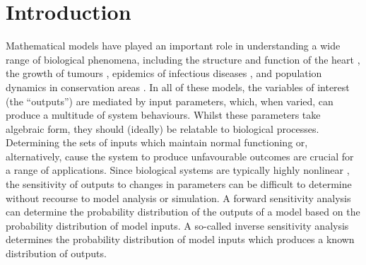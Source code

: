 \documentclass[10pt,letterpaper]{article}
\begin{document}

\section{Introduction}
\label{sec:inverse_sensitivity}

Mathematical models have played an important role in understanding a wide range of biological phenomena, including the structure and function of the heart \cite{nielsen1991mathematical,noble2004modeling}, the growth of tumours \cite{byrne2006modelling,byrne2010dissecting}, epidemics of infectious diseases \cite{anderson1992infectious}, and population dynamics in conservation areas \cite{morris2002quantitative,hanski2001spatially}. In all of these models, the variables of interest (the ``outputs'') are mediated by input parameters, which, when varied, can produce a multitude of system behaviours. Whilst these parameters take algebraic  form, they should (ideally) be relatable to biological processes. Determining the sets of inputs which maintain normal functioning or, alternatively, cause the system to produce unfavourable outcomes are crucial for a range of applications. Since biological systems are typically highly nonlinear \cite{murray2007mathematical}, the sensitivity of outputs to changes in parameters can be difficult to determine without recourse to model analysis or simulation. A forward sensitivity analysis can determine the probability distribution of the outputs of a model based on the probability distribution of model inputs. A so-called inverse sensitivity analysis determines the probability distribution of model inputs which produces a known distribution of outputs.
\end{document}
